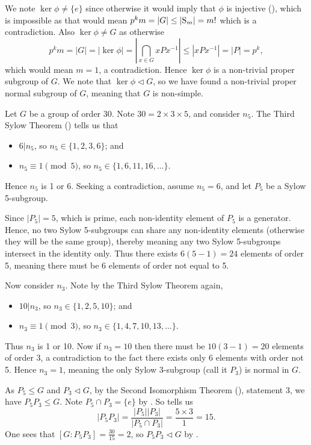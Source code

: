 \begin{questions}
    We note $\ker\phi \neq \{e\}$ since otherwise it would imply that $\phi$ is injective (), which is impossible as that would mean $p^km = |G| \leq |\mathrm{S}_{m}| = m!$ which is a contradiction. Also $\ker\phi \neq G$ as otherwise
    \[
        p^km = |G| = |\ker\phi| = \left|\bigcap_{x \in G} xPx^{-1}\right| \leq |xPx^{-1}| = |P| = p^k,
    \]
    which would mean $m = 1$, a contradiction. Hence $\ker\phi$ is a non-trivial proper subgroup of $G$. We note that $\ker\phi \lhd G$, so we have found a non-trivial proper normal subgroup of $G$, meaning that $G$ is non-simple.

    \item Let $G$ be a group of order 30. Note $30 = 2 \times 3 \times 5$, and consider $n_5$. The Third Sylow Theorem () tells us that
    \begin{itemize}
        \item $6 \vert n_5$, so $n_5 \in \{1, 2, 3, 6\}$; and
        \item $n_5 \equiv 1 \pmod 5$, so $n_5 \in \{1, 6, 11, 16, \dots\}$.
    \end{itemize}
    Hence $n_5$ is 1 or 6. Seeking a contradiction, assume $n_5 = 6$, and let $P_5$ be a Sylow 5-subgroup.

    Since $|P_5| = 5$, which is prime, each non-identity element of $P_5$ is a generator. Hence, no two Sylow 5-subgroups can share any non-identity elements (otherwise they will be the same group), thereby meaning any two Sylow 5-subgroups intersect in the identity only. Thus there exists $6(5-1) = 24$ elements of order 5, meaning there must be 6 elements of order not equal to 5.

    Now consider $n_3$. Note by the Third Sylow Theorem again,
    \begin{itemize}
        \item $10 \vert n_3$, so $n_3 \in \{1, 2, 5, 10\}$; and
        \item $n_3 \equiv 1 \pmod 3$, so $n_3 \in \{1, 4, 7, 10, 13, \dots\}$.
    \end{itemize}
    Thus $n_3$ is 1 or 10. Now if $n_3 = 10$ then there must be $10(3-1) = 20$ elements of order 3, a contradiction to the fact there exists only 6 elements with order not 5. Hence $n_3 = 1$, meaning the only Sylow 3-subgroup (call it $P_3$) is normal in $G$.

    As $P_5 \leq G$ and $P_3 \lhd G$, by the Second Isomorphism Theorem (), statement 3, we have $P_5P_3 \leq G$. Note $P_5 \cap P_3 = \{e\}$ by . So  tells us
    \[
        |P_5P_3| = \frac{|P_5||P_3|}{|P_5 \cap P_3|} = \frac{5\times3}{1} = 15.
    \]
    One sees that $[G:P_5P_3] = \frac{30}{15} = 2$, so $P_5P_3 \lhd G$ by .


\end{questions}
